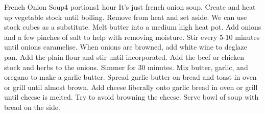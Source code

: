 \documentclass[11pt]{article}
\begin{document}
\begin{recipe}[FrenchOnionSoup]{French Onion Soup}{4 portions}{1 hour}
    \freeform It's just french onion soup.
    Create and heat up vegetable stock until boiling. Remove from heat and set aside. We can use stock cubes as a substitute.
    Melt butter into a medium high heat pot. Add onions and a few pinches of salt to help with removing moisture. Stir every 5-10 minutes until onions caramelise.
    When onions are browned, add white wine to deglaze pan. Add the plain flour and stir until incorporated.
    Add the beef or chicken stock and herbs to the onions. Simmer for 30 minutes.
    Mix butter, garlic, and oregano to make a garlic butter. Spread garlic butter on bread and toast in oven or grill until almost brown.
    Add cheese liberally onto garlic bread in oven or grill until cheese is melted. Try to avoid browning the cheese.
    \newstep
    Serve bowl of soup with bread on the side.
    \freeform\hrulefill
\end{recipe}
\end{document}
